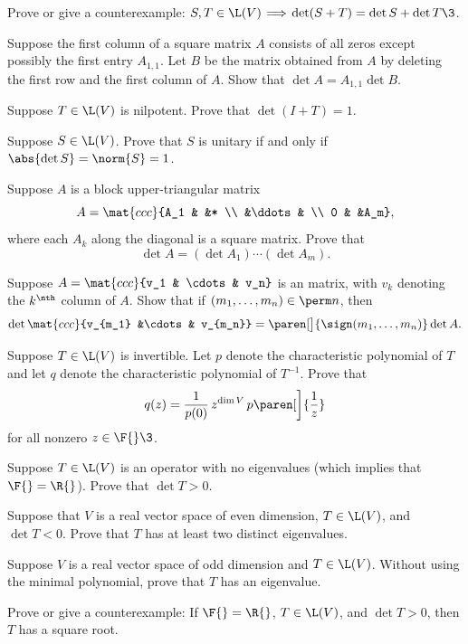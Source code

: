 
\exercise
Prove or give a counterexample: $S, T \in \L(V) \!\implies\! \det (S+T) = \det S + \det T\3$.


\exercise
Suppose the first column of a square matrix $A$ consists of all zeros except possibly the first entry $A_{1,1}$. Let $B$ be the matrix obtained from $A$ by deleting the first row and the first column of $A$. Show that $\det A = A_{1,1} \det B$.


\exercise
Suppose $T \in \L(V)$ is nilpotent. Prove that $\det(I + T) = 1$.


\exercise
Suppose $S \in \L(V)$. Prove that $S$ is unitary if and only if $\abs{\det S} = \norm{S} = 1$.


\exercise
Suppose $A$ is a block upper-triangular matrix \label{blockdet}
\[
A = \mat{ccc}{A_1 & &* \\ &\ddots & \\ 0 & &A_m},
\]
where each $A_k$ along the diagonal is a square matrix.  Prove that
\[
\det A = (\det A_1) \dotsm (\det A_m).
\]
\exercisedisplayend


\exercise
Suppose $A = \mat{ccc}{v_1 & \cdots & v_n}$ is an  matrix, with $v_k$ denoting the $k^\nth$ column of $A$. Show that if
$(m_1, \ldots, m_n) \in \perm n$, then
\[
\det \mat{ccc}{v_{m_1} &\cdots & v_{m_n}} = \paren[\big]{\sign(m_1, \ldots, m_n)} \det A.
\]
\exercisedisplayend


\exercise
Suppose $T \in \L(V)$ is invertible. Let $p$ denote the characteristic polynomial of $T$ and let $q$ denote the characteristic polynomial of $T^{-1}$. Prove that
\[
q(z) = \frac{1}{p(0)}\, z^{\dim V} \, p\paren[\bigg]{\frac{1}{z}}
\]
for all nonzero $z \in \F{}\3$.


\exercise
Suppose $T \in \L(V)$ is an operator with no eigenvalues (which implies that $\F{} = \R{}$). Prove that $\det T > 0$.


\exercise
Suppose that $V$ is a real vector space of even dimension, $T \in \L(V)$, and $\det T < 0$. Prove that $T$ has at least two distinct eigenvalues.


\exercise
Suppose $V$ is a real vector space of odd dimension and $T \in \L(V)$. Without using the minimal polynomial, prove that $T$ has an eigenvalue.\label{9oddeigen}


\exercise
Prove or give a counterexample: If $\F{} = \R{}$, $T \in \L(V)$, and $\det T > 0$, then $T$ has a square root.


